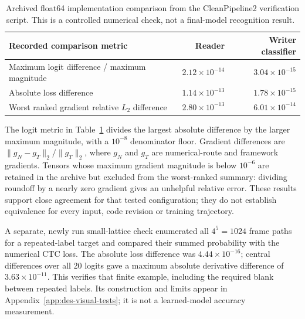 \begin{table}[H]\centering\small
\begin{tabularx}{\linewidth}{|X|r|r|}
\hline\textbf{Recorded comparison metric}&\textbf{Reader}&\textbf{Writer classifier}\\\hline
Maximum logit difference / maximum magnitude&$2.12\times10^{-14}$&$3.04\times10^{-15}$\\\hline
Absolute loss difference&$1.14\times10^{-13}$&$1.78\times10^{-15}$\\\hline
Worst ranked gradient relative $L_2$ difference&$2.80\times10^{-13}$&$6.01\times10^{-14}$\\\hline
\end{tabularx}
\caption{Archived float64 implementation comparison from the CleanPipeline2 verification script. This is a controlled numerical check, not a final-model recognition result.~\cite{brauneevidence2026,braunepipeline2026}}
\label{tab:des-numericalcheck}
\end{table}

The logit metric in Table~\ref{tab:des-numericalcheck} divides the largest absolute difference by the larger maximum magnitude, with a $10^{-8}$ denominator floor. Gradient differences are $\|g_N-g_T\|_2/\|g_T\|_2$, where $g_N$ and $g_T$ are numerical-route and framework gradients. Tensors whose maximum gradient magnitude is below $10^{-6}$ are retained in the archive but excluded from the worst-ranked summary: dividing roundoff by a nearly zero gradient gives an unhelpful relative error. These results support close agreement for that tested configuration; they do not establish equivalence for every input, code revision or training trajectory.~\cite[recognise.py; train.py]{braunepipeline2026}


A separate, newly run small-lattice check enumerated all $4^5=1024$ frame paths for a repeated-label target and compared their summed probability with the numerical CTC loss. The absolute loss difference was $4.44\times10^{-16}$; central differences over all 20 logits gave a maximum absolute derivative difference of $3.63\times10^{-11}$. This verifies that finite example, including the required blank between repeated labels. Its construction and limits appear in Appendix~\ref{app:des-visual-tests}; it is not a learned-model accuracy measurement.~\cite[project records; implementation]{brauneevidence2026,braunepipeline2026}

